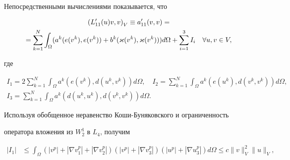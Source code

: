 \begin{pf} Непосредственными вычислениями показывается, что 


\begin{gather}


\label{a'11}


\left( L'_{11}(u)v , v \right)_V \equiv a'_{11}(v,v) =\notag\\


%


= \sum \limits _{k=1}^N


 \int_{\Omega} (a^k(e(v^k),e(v^k)) + 


b^k(\varkappa (v^k), \varkappa (v^k)))


 d\Omega + \sum \limits _{i=1}^3 I_i \quad \forall u, v \in V,


\end{gather}


где


\begin{gather*}


I_1 = 


2 \sum \limits _{k=1}^N \int_{\Omega} 


 a^k(e(v^k) ,d(u^k,v^k)) 


 d \Omega,\quad 


I_2 = 


 \sum \limits _{k=1}^N \int_{\Omega} 


 a^k(e(u^k) ,d(v^k,v^k)) 


 d \Omega, \\


I_3 = 


\sum \limits _{k=1}^N \int_{\Omega} 


 a^k(d(u^k,u^k) ,d(v^k,v^k)) d \Omega.


\end{gather*}


Используя обобщенное неравенство Коши-Буняковского и ограниченность


оператора вложения из $ W_2^1 $ в $L_4$, получим


\begin{align*}


| I_1 | &\le


\int_ \Omega ( |v^p | + | \nabla v^p_1 |


+ | \nabla v^p_2 | )


( |v^p | + | \nabla v^p_3 | )


( |u^p | + | \nabla u^p_3 | )


d\Omega \le c\| v \|_V^2 \|u\|_V,\\



\end{align*}
\end{pf}

